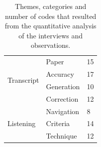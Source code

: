 \begin{table}[h]
{\begin{tabular}{|l|l|l|}
      \multirow{4}{*}{Transcript}
      & Paper & 15 \\ \cline{2-3}%
      & Accuracy & 17 \\ \cline{2-3} %
      & Generation & 10 \\ \cline{2-3} %
      & Correction & 12 \\ \hline %
      \multirow{3}{*}{Listening}
      & Navigation & 8 \\ \cline{2-3} %
      & Criteria & 14 \\ \cline{2-3} %
      & Technique & 12 \\ \hline %

    \end{tabular}
  }
  \caption{Themes, categories and number of codes that resulted from the quantitative analysis of the interviews and
  observations.}
  \label{tab:paper-codes}
\end{table}

